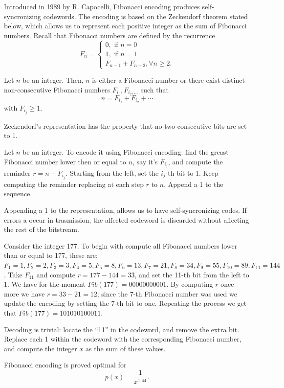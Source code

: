 \documentclass{subfiles}
\begin{document}
    Introduced in 1989 by R. Capocelli, Fibonacci encoding produces self-syncronizing codewords.
        The encoding is based on the Zeckendorf theorem stated below,
        which allows us to represent each positive integer as the sum of Fibonacci numbers.
        Recall that Fibonacci numbers are defined by the recurrence 
        \[
            F_{n} = \begin{cases}
                0, \text{ if } n = 0 \\ 
                1, \text{ if } n = 1 \\ 
                F_{n - 1} + F_{n - 2}, \forall n \ge 2.
            \end{cases}
        \]

    \begin{theorem*}[Zeckendorf's]
        Let \(n\) be an integer. 
            Then, \(n\) is either a Fibonacci number or 
            there exist distinct non-consecutive Fibonacci numbers
            \(F_{i_{1}}, F_{i_{2}, \ldots}\) such that
            \[
                n = F_{i_{1}} + F_{i_{2}} + \cdots 
            \]
            with \(F_{i_{j}} \ge 1\).
    \end{theorem*}
    Zeckendorf's representation has the property that no two consecutive bits 
        are set to 1.

    Let \(n\) be an integer. To encode it using Fibonacci encoding:
        find the greast Fibonacci number lower then or equal to \(n\),
        say it's \(F_{i_{j}}\), and compute the reminder \(r = n - F_{i_{j}}\).
        Starting from the left, set the \(i_{j}\)-th bit to 1.
        Keep computing the reminder replacing at each step \(r\) to \(n\).
        Append a 1 to the sequence.

    Appending a 1 to the representation, allows us to have self-syncronizing codes.
        If errors a occur in trasmission, the affected codeword is discarded 
        without affecting the rest of the bitstream. 

    \begin{example*}
        Consider the integer 177. To begin with compute all Fibonacci numbers 
            lower than or equal to 177, these are: \(F_{1} = 1, F_{2} = 2, F_{3} = 3,
            F_{4} = 5, F_{5} = 8, F_{6} = 13, F_{7} = 21, F_{8} = 34, F_{9} = 55,
            F_{10} = 89, F_{11} = 144\). Take \(F_{11}\) and compute \(r = 177 - 144 = 33\),
            and set the 11-th bit from the left to 1. 
            We have for the moment \(Fib(177) = 00000000001\).
            By computing \(r\) once more we have \(r = 33 - 21 = 12\);
            since the \(7\)-th Fibonacci number was used we update the encoding by setting the 
            \(7\)-th bit to one. Repeating the process we get that \(Fib(177) = 101010100011\).
    \end{example*}

    Decoding is trivial: locate the ``11'' in the codeword, and remove the extra bit.
        Replace each 1 within the codeword with the corresponding Fibonacci number,
        and compute the integer \(x\) as the sum of these values.

    Fibonacci encoding is proved optimal for 
    \[
        p(x) = \frac{1}{x^{1.44}}.
    \]
\end{document}
